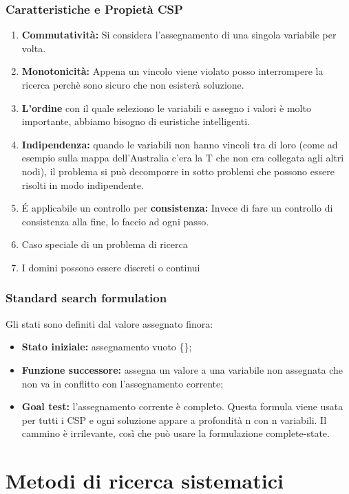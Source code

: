 \subsection{Caratteristiche e Propietà CSP}
\begin{enumerate}
    \item \textbf{Commutatività:} Si considera l’assegnamento di una singola variabile per volta.
    \item \textbf{Monotonicità:} Appena un vincolo viene violato posso interrompere la ricerca perchè sono sicuro che non esisterà soluzione.
    \item \textbf{L’ordine} con il quale seleziono le variabili e assegno i valori è molto importante, abbiamo bisogno di euristiche intelligenti.
    \item \textbf{Indipendenza:} quando le variabili non hanno vincoli tra di loro (come ad esempio sulla mappa dell’Australia c’era la T che non era collegata agli altri nodi), il problema si può decomporre in sotto problemi che possono essere risolti in modo indipendente.
    \item É applicabile un controllo per \textbf{consistenza:} Invece di fare un controllo di consistenza alla fine, lo faccio ad ogni passo.
    \item Caso speciale di un problema di ricerca
    \item I domini possono essere discreti o continui
\end{enumerate}
\subsection{Standard search formulation}
Gli stati sono definiti dal valore assegnato finora:
\begin{itemize}
    \item \textbf{Stato iniziale: }assegnamento vuoto \{\};
    \item \textbf{Funzione successore: }assegna un valore a una variabile non assegnata che non va in conflitto con l’assegnamento corrente;
    \item \textbf{Goal test: }l’assegnamento corrente è completo. Questa formula viene usata per tutti i CSP e ogni soluzione appare a profondità n con n variabili. Il cammino è irrilevante, così che può usare la formulazione complete-state.
\end{itemize}
\chapter{Metodi di ricerca sistematici} \label{ch:Metodi di ricerca sistematici}
